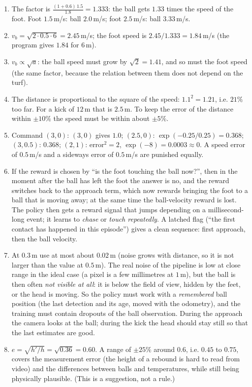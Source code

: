 \begin{enumerate}[label=\textbf{\ansnum.\arabic*}]
  \item The factor is $\tfrac{(1+0.6)\,1.5}{1.8}=1.333$: the ball gets $1.33$ times the speed of the foot. Foot $1.5$\,m/s: ball $2.0$\,m/s; foot $2.5$\,m/s: ball $3.33$\,m/s.
  \item $v_b=\sqrt{2\cdot0.5\cdot6}=2.45$\,m/s; the foot speed is $2.45/1.333=1.84$\,m/s (the program gives $1.84$ for $6$\,m).
  \item $v_b\propto\sqrt{a}$: the ball speed must grow by $\sqrt2=1.41$, and so must the foot speed (the same factor, because the relation between them does not depend on the turf).
  \item The distance is proportional to the square of the speed: $1.1^2=1.21$, i.e. $21\%$ too far. For a kick of $12$\,m that is $2.5$\,m. To keep the error of the distance within $\pm10\%$ the speed must be within about $\pm5\%$.
  \item Command $(3,0)$: $(3,0)$ gives $1.0$; $(2.5,0)$: $\exp(-0.25/0.25)=0.368$; $(3,0.5)$: $0.368$; $(2,1)$: error$^2=2$, $\exp(-8)=0.0003\approx0$. A speed error of $0.5$\,m/s and a sideways error of $0.5$\,m/s are punished equally.
  \item If the reward is chosen by ``is the foot touching the ball now?'', then in the moment after the ball has left the foot the answer is no, and the reward switches back to the approach term, which now rewards bringing the foot to a ball that is moving away; at the same time the ball-velocity reward is lost. The policy then gets a reward signal that jumps depending on a millisecond-long event; it learns to \emph{chase} or \emph{touch repeatedly}. A latched flag (``the first contact has happened in this episode'') gives a clean sequence: first approach, then the ball velocity.
  \item At $0.3$\,m use at most about $0.02$\,m (noise grows with distance, so it is not larger than the value at $0.5$\,m). The real noise of the pipeline is low at close range in the ideal case (a pixel is a few millimetres at $1$\,m), but the ball is then often \emph{not visible at all}: it is below the field of view, hidden by the feet, or the head is moving. So the policy must work with a \emph{remembered} ball position (the last detection and its age, moved with the odometry), and the training must contain dropouts of the ball observation. During the approach the camera looks at the ball; during the kick the head should stay still so that the last estimates are good.
  \item $e=\sqrt{h'/h}=\sqrt{0.36}=0.60$. A range of $\pm25\%$ around $0.6$, i.e. $0.45$ to $0.75$, covers the measurement error (the height of a rebound is hard to read from video) and the differences between balls and temperatures, while still being physically plausible. (This is a suggestion, not a rule.)

\end{enumerate}
